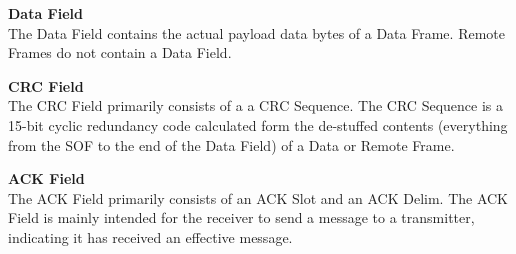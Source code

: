 \documentclass[main\_\_EN.tex]{subfiles}
\begin{document}
{\bfseries Data Field}\\

The Data Field contains the actual payload data bytes of a Data Frame. Remote Frames do not contain a Data Field.

{\bfseries CRC Field}\\

The CRC Field primarily consists of a a CRC Sequence. The CRC Sequence is a 15-bit cyclic redundancy code calculated form the de-stuffed contents (everything from the SOF to the end of the Data Field) of a Data or Remote Frame.

{\bfseries ACK Field}\\
The ACK Field primarily consists of an ACK Slot and an ACK Delim. The ACK Field is mainly intended for the receiver to send a message to a transmitter, indicating it has received an effective message.
\end{document}
